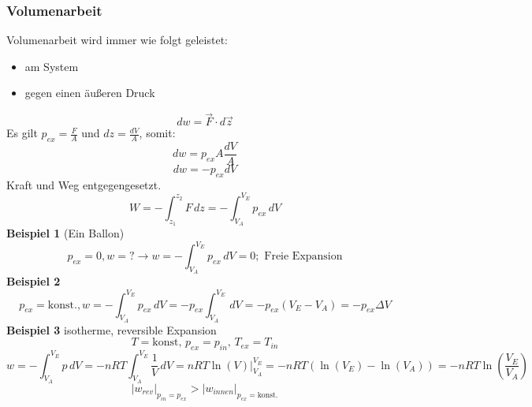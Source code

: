\documentclass[a4paper, fleqn]{article}
\begin{document}
\subsubsection{Volumenarbeit}
Volumenarbeit wird immer wie folgt geleistet:
\begin{itemize}
    \item am System
    \item gegen einen äußeren Druck
\end{itemize}
\begin{equation*}
    dw = \vec{F} \cdot d\vec{z}
\end{equation*}
Es gilt $p_{ex} = \frac{F}{A}$ und $dz = \frac{dV}{A}$, somit:
\begin{equation*}
    dw = p_{ex}A \frac{dV}{A}
\end{equation*}
\begin{equation*}
    dw = -p_{ex} dV
\end{equation*}
Kraft und Weg entgegengesetzt.
\begin{equation*}
    W = - \int_{z_1}^{z_2} F\,dz = - \int_{V_A}^{V_E} p_{ex} \,dV 
\end{equation*}
\textbf{Beispiel 1} (Ein Ballon)
\begin{equation*}
    p_{ex} = 0, w = ? \rightarrow w = - \int_{V_A}^{V_E} p_{ex} \, dV = 0; \text{ Freie Expansion}
\end{equation*}
\textbf{Beispiel 2}
\begin{equation*}
    p_{ex} = \text{konst.}, w = -\int_{V_A}^{V_E} p_{ex} \, dV = - p_{ex} \int_{V_A}^{V_E} \, dV = -p_{ex}(V_E-V_A) = -p_{ex}\Delta V
\end{equation*}
\textbf{Beispiel 3} isotherme, reversible Expansion
\begin{equation*}
    T = \text{konst},\,p_{ex}=p_{in},\,T_{ex} = T_{in}
\end{equation*}
\begin{equation*}
    w = -\int_{V_A}^{V_E}p\,dV = -nRT \int_{V_A}^{V_E} \frac{1}{V} \,dV = nRT \ln(V) \vert_{V_A}^{V_E} = -nRT(\ln(V_E)-\ln(V_A)) = -nRT\ln\left(\frac{V_E}{V_A}\right)
\end{equation*}
\begin{equation*}
    |w_{rev}|_{p_{in} = p_{ex}} > |w_{innen}|_{p_{ex}=\text{konst.}}
\end{equation*}
\end{document}
